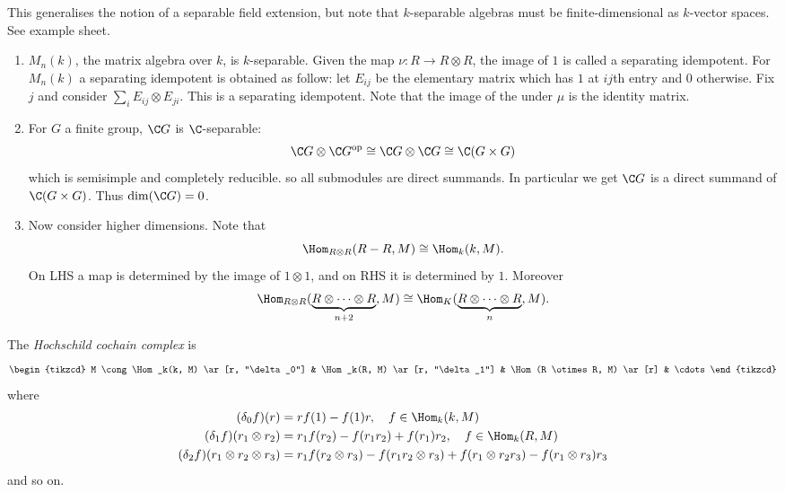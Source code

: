 \documentclass[a4paper]{article}
\begin{document}
This generalises the notion of a separable field extension, but note that \(k\)-separable algebras must be finite-dimensional as \(k\)-vector spaces. See example sheet.

\begin{eg}\leavevmode
  \begin{enumerate}
  \item \(M_n(k)\), the matrix algebra over \(k\), is \(k\)-separable. Given the map \(\nu: R \to R \otimes R\), the image of \(1\) is called a separating idempotent. For \(M_n(k)\) a separating idempotent is obtained as follow: let \(E_{ij}\) be the elementary matrix which has \(1\) at \(ij\)th entry and \(0\) otherwise. Fix \(j\) and consider \(\sum_i E_{ij} \otimes E_{ji}\). This is a separating idempotent. Note that the image of the under \(\mu\) is the identity matrix.
  \item For \(G\) a finite group, \(\C G\) is \(\C\)-separable:
    \[
      \C G \otimes \C G^{\text{op}}
      \cong \C G \otimes \C G
      \cong \C( G \times G)
    \]
    which is semisimple and completely reducible. so all submodules are direct summands. In particular we get \(\C G\) is a direct summand of \(\C(G \times G)\). Thus \(\dim (\C G) = 0\).
  \item Now consider higher dimensions. Note that
    \[
      \Hom_{R \otimes R} (R - R, M) \cong \Hom_k (k, M).
    \]
    On LHS a map is determined by the image of \(1 \otimes 1\), and on RHS it is determined by \(1\). Moreover
    \[
      \Hom_{R \otimes R} (\underbrace{R \otimes \dots \otimes R}_{n + 2}, M) \cong \Hom_K  (\underbrace{R \otimes \dots \otimes R}_n, M).
    \]
  \end{enumerate}
\end{eg}

\begin{definition}
  The \emph{Hochschild cochain complex} is
  \[
    \begin{tikzcd}
      M \cong \Hom_k(k, M) \ar[r, "\delta_0"] & \Hom_k(R, M) \ar[r, "\delta_1"] & \Hom(R \otimes R, M) \ar[r] & \cdots
    \end{tikzcd}
  \]
  where
  \begin{align*}
    (\delta_0 f)(r) &= rf(1) - f(1) r, \quad f \in \Hom_k(k, M) \\
    (\delta_1 f)(r_1 \otimes r_2) &= r_1 f(r_2) - f(r_1r_2) + f(r_1)r_2, \quad f \in \Hom_k(R, M) \\
    (\delta_2 f)(r_1 \otimes r_2 \otimes r_3) &= r_1 f(r_2 \otimes r_3) - f(r_1r_2 \otimes r_3) + f(r_1 \otimes r_2r_3) - f(r_1 \otimes r_3) r_3 \\
  \end{align*}
  and so on.
\end{definition}
\end{document}
